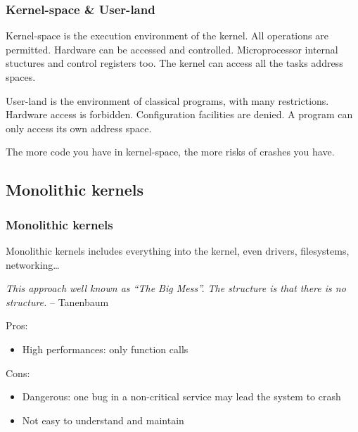 
\begin{frame}
  \frametitle{Kernel-space \& User-land}

  Kernel-space is the execution environment of the kernel. All
  operations are permitted. Hardware can be accessed and
  controlled. Microprocessor internal stuctures and control registers
  too. The kernel can access all the tasks address spaces.

  \-

  User-land is the environment of classical programs, with many
  restrictions. Hardware access is forbidden. Configuration facilities
  are denied. A program can only access its own address space.

  \-

  The more code you have in kernel-space, the more risks of crashes you
  have.

\end{frame}

%
%

\subsection{Monolithic kernels}

%
%

\begin{frame}
  \frametitle{Monolithic kernels}

  Monolithic kernels includes everything into the kernel, even
  drivers, filesystems, networking\ldots

  \-

  \emph{This approach well known as ``The Big Mess''. The structure is
  that there is no structure.} -- Tanenbaum

  \-

  Pros:

  \begin{itemize}
  \item
    High performances: only function calls
  \end{itemize}

  \-

  Cons:

  \begin{itemize}
  \item
    Dangerous: one bug in a non-critical service may lead the system
    to crash
  \item
    Not easy to understand and maintain
  \end{itemize}

\end{frame}

